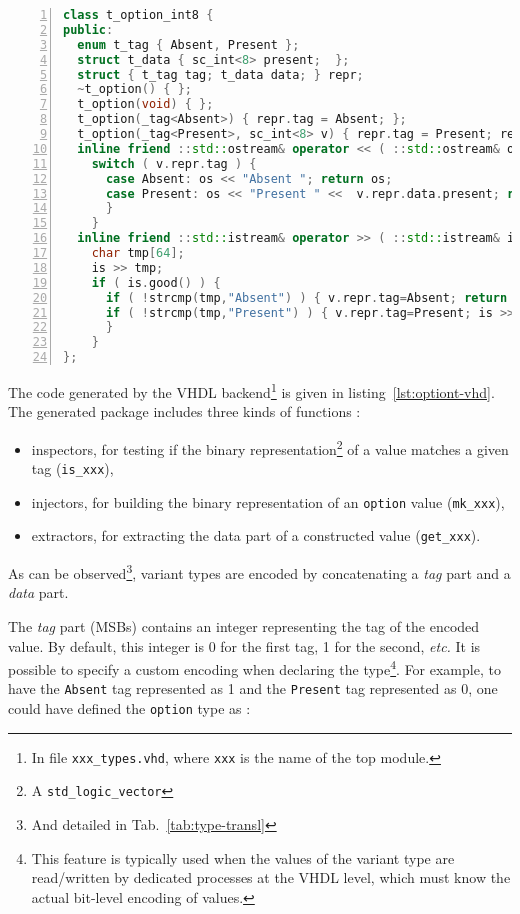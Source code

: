 \begin{lstlisting}[language=C++,frame=single,numbers=left,caption={Code generated by the SystemC
    backend for the \texttt{option} type declaration},label={lst:optiont-cpp}]
class t_option_int8 {
public:
  enum t_tag { Absent, Present };
  struct t_data { sc_int<8> present;  };
  struct { t_tag tag; t_data data; } repr;
  ~t_option() { };
  t_option(void) { };
  t_option(_tag<Absent>) { repr.tag = Absent; };
  t_option(_tag<Present>, sc_int<8> v) { repr.tag = Present; repr.data.present = v; };
  inline friend ::std::ostream& operator << ( ::std::ostream& os, const t_option<sc_int<8> >& v) {
    switch ( v.repr.tag ) {
      case Absent: os << "Absent "; return os;
      case Present: os << "Present " <<  v.repr.data.present; return os;
      }
    }
  inline friend ::std::istream& operator >> ( ::std::istream& is, t_option<sc_int<8> >& v) {
    char tmp[64];
    is >> tmp;
    if ( is.good() ) {
      if ( !strcmp(tmp,"Absent") ) { v.repr.tag=Absent; return is;}
      if ( !strcmp(tmp,"Present") ) { v.repr.tag=Present; is >> v.repr.data.present; return is;}
      }
    }
};
\end{lstlisting}

\bigskip The code generated by the VHDL backend\footnote{In file \texttt{xxx\_types.vhd}, where
  \texttt{xxx} is the name of the top module.} is given in
listing~\ref{lst:optiont-vhd}.  The generated package includes three kinds of
functions :
\begin{itemize}
\item inspectors, for testing if the binary representation\footnote{A \texttt{std\_logic\_vector}}
  of a value matches a given tag (\verb|is_xxx|),
\item injectors, for building the binary representation of an \texttt{option} value (\verb|mk_xxx|),
\item extractors, for extracting the data part of a constructed value (\verb|get_xxx|).
\end{itemize}

As can be observed\footnote{And detailed in Tab.~\ref{tab:type-transl}}, 
variant types are encoded by concatenating a \emph{tag} part and a \emph{data} part.

The \emph{tag}
part (MSBs) contains an integer representing the tag of the encoded value. By default, this integer is 0
for the first tag, 1 for the second, \emph{etc.} It is possible to specify a custom encoding
when declaring the type\footnote{This feature is typically used when the values of the variant type
  are read/written by dedicated processes at the VHDL level, which must know the actual bit-level
  encoding of values.}. For example, to have the \verb|Absent| tag represented as 1 and the
\verb|Present| tag represented as 0, one could have defined the \verb|option| type as :

